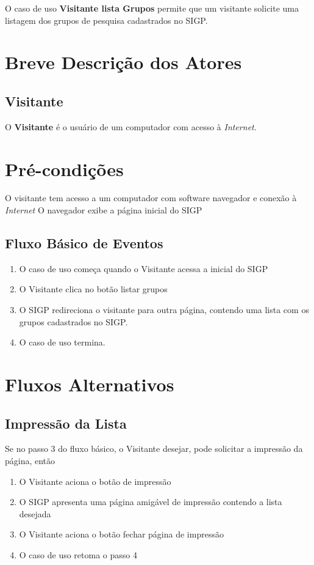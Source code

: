 \documentclass[11pt, a4paper,oneside]{book}
\begin{document}
O caso de uso \textbf{Visitante lista Grupos} permite que um visitante solicite uma listagem dos grupos de pesquisa cadastrados no SIGP.

\section{Breve Descrição dos Atores}

\subsection{Visitante}

O \textbf{Visitante} é o usuário de um computador com acesso à \emph{Internet}.

\section{Pré-condições}
O visitante tem acesso a um computador com software navegador e conexão à \emph{Internet}
O navegador exibe a página inicial do SIGP

\subsection{Fluxo Básico de Eventos}

\begin{enumerate}
\item O caso de uso começa quando o Visitante acessa a inicial do SIGP
\item O Visitante clica no botão listar grupos
\item O SIGP redireciona o visitante para outra página, contendo uma lista com os grupos cadastrados no SIGP.
\item O caso de uso termina.
\end{enumerate}

\section{Fluxos Alternativos}

\subsection{Impressão da Lista}
Se no passo $3$ do fluxo básico, o Visitante desejar, pode solicitar a impressão da página, então

\begin{enumerate}
\item O Visitante aciona o botão de impressão
\item O SIGP apresenta uma página amigável de impressão contendo a lista desejada
\item O Visitante aciona o botão fechar página de impressão
\item O caso de uso retoma o passo 4
\end{enumerate}
\end{document}
